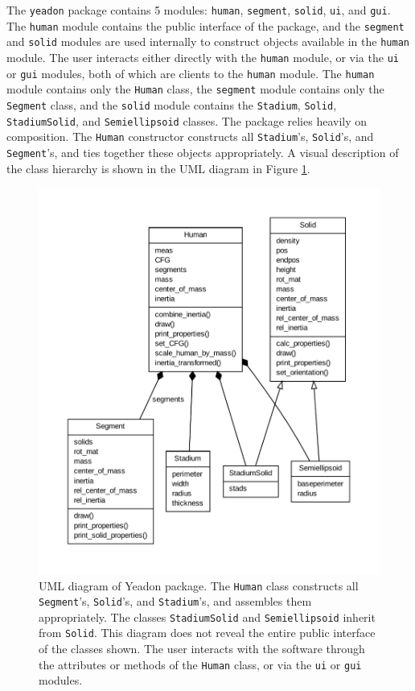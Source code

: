 \documentclass[10pt,a4paper,twocolumn]{article}
\begin{document}
The \verb+yeadon+ package contains 5 modules: \verb+human+, \verb+segment+,
\verb+solid+, \verb+ui+, and \verb+gui+. The \verb+human+ module contains the
public interface of the package, and the \verb+segment+ and \verb+solid+
modules are used internally to construct objects available in the
\verb+human+ module. The user interacts either directly with the \verb+human+
module, or via the \verb+ui+ or \verb+gui+ modules, both of which are clients
to the \verb+human+ module. The \verb+human+ module contains only the
\verb+Human+ class, the \verb+segment+ module contains only the \verb+Segment+
class, and the \verb+solid+ module contains the \verb+Stadium+, \verb+Solid+,
\verb+StadiumSolid+, and \verb+Semiellipsoid+ classes. The package relies
heavily on composition. The \verb+Human+ constructor constructs all
\verb+Stadium+'s, \verb+Solid+'s, and \verb+Segment+'s, and ties together these
objects appropriately. A visual description of the class hierarchy is shown in
the UML diagram in Figure \ref{fig:umldiagram}.

\begin{figure}
  \begin{center}
    \includegraphics[width=\columnwidth]{figures/umldiagram.pdf}
  \end{center}
  \cprotect\caption{
    UML diagram of Yeadon package.
    The \verb+Human+ class constructs all \verb+Segment+'s, \verb+Solid+'s, and
    \verb+Stadium+'s, and assembles them appropriately. The classes
    \verb+StadiumSolid+ and \verb+Semiellipsoid+ inherit from \verb+Solid+.
    This diagram does not reveal the entire public interface of the classes
    shown. The user interacts with the software through the attributes or methods of
    the \verb+Human+ class, or via the \verb+ui+ or \verb+gui+ modules.
  }
  \label{fig:umldiagram}
\end{figure}
\end{document}
